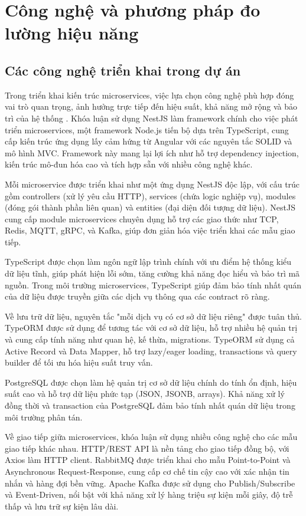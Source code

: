\section{Công nghệ và phương pháp đo lường hiệu năng}

\subsection{Các công nghệ triển khai trong dự án}
Trong triển khai kiến trúc microservices, việc lựa chọn công nghệ phù hợp đóng vai trò quan trọng, ảnh hưởng trực tiếp đến hiệu suất, khả năng mở rộng và bảo trì của hệ thống \cite{newman2015}. Khóa luận sử dụng NestJS làm framework chính cho việc phát triển microservices, một framework Node.js tiến bộ dựa trên TypeScript, cung cấp kiến trúc ứng dụng lấy cảm hứng từ Angular với các nguyên tắc SOLID và mô hình MVC. Framework này mang lại lợi ích như hỗ trợ dependency injection, kiến trúc mô-đun hóa cao và tích hợp sẵn với nhiều công nghệ khác.

Mỗi microservice được triển khai như một ứng dụng NestJS độc lập, với cấu trúc gồm controllers (xử lý yêu cầu HTTP), services (chứa logic nghiệp vụ), modules (đóng gói thành phần liên quan) và entities (đại diện đối tượng dữ liệu). NestJS cung cấp module microservices chuyên dụng hỗ trợ các giao thức như TCP, Redis, MQTT, gRPC, và Kafka, giúp đơn giản hóa việc triển khai các mẫu giao tiếp.

TypeScript được chọn làm ngôn ngữ lập trình chính với ưu điểm hệ thống kiểu dữ liệu tĩnh, giúp phát hiện lỗi sớm, tăng cường khả năng đọc hiểu và bảo trì mã nguồn. Trong môi trường microservices, TypeScript giúp đảm bảo tính nhất quán của dữ liệu được truyền giữa các dịch vụ thông qua các contract rõ ràng.

Về lưu trữ dữ liệu, nguyên tắc "mỗi dịch vụ có cơ sở dữ liệu riêng" được tuân thủ. TypeORM được sử dụng để tương tác với cơ sở dữ liệu, hỗ trợ nhiều hệ quản trị và cung cấp tính năng như quan hệ, kế thừa, migrations. TypeORM sử dụng cả Active Record và Data Mapper, hỗ trợ lazy/eager loading, transactions và query builder để tối ưu hóa hiệu suất truy vấn.

PostgreSQL được chọn làm hệ quản trị cơ sở dữ liệu chính do tính ổn định, hiệu suất cao và hỗ trợ dữ liệu phức tạp (JSON, JSONB, arrays). Khả năng xử lý đồng thời và transaction của PostgreSQL đảm bảo tính nhất quán dữ liệu trong môi trường phân tán.

Về giao tiếp giữa microservices, khóa luận sử dụng nhiều công nghệ cho các mẫu giao tiếp khác nhau. HTTP/REST API là nền tảng cho giao tiếp đồng bộ, với Axios làm HTTP client. RabbitMQ được triển khai cho mẫu Point-to-Point và Asynchronous Request-Response, cung cấp cơ chế tin cậy cao với xác nhận tin nhắn và hàng đợi bền vững. Apache Kafka được sử dụng cho Publish/Subscribe và Event-Driven, nổi bật với khả năng xử lý hàng triệu sự kiện mỗi giây, độ trễ thấp và lưu trữ sự kiện lâu dài.

